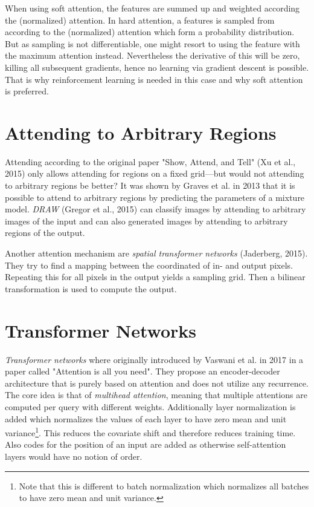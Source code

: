 		When using soft attention, the features are summed up and weighted according the (normalized) attention. In hard attention, a features is sampled from according to the (normalized) attention which form a probability distribution. But as sampling is not differentiable, one might resort to using the feature with the maximum attention instead. Nevertheless the derivative of this will be zero, killing all subsequent gradients, hence no learning via gradient descent is possible. That is why reinforcement learning is needed in this case and why soft attention is preferred.

	\section{Attending to Arbitrary Regions}
		Attending according to the original paper "Show, Attend, and Tell" (Xu et al., 2015) only allows attending for regions on a fixed grid---but would not attending to arbitrary regions be better? It was shown by Graves et al. in 2013 that it is possible to attend to arbitrary regions by predicting the parameters of a mixture model. \emph{DRAW} (Gregor et al., 2015) can classify images by attending to arbitrary images of the input and can also generated images by attending to arbitrary regions of the output.

		Another attention mechanism are \emph{spatial transformer networks} (Jaderberg, 2015). They try to find a mapping between the coordinated of in- and output pixels. Repeating this for all pixels in the output yields a sampling grid. Then a bilinear transformation is used to compute the output.

	\section{Transformer Networks}
		\emph{Transformer networks} where originally introduced by Vaswani et al. in 2017 in a paper called "Attention is all you need". They propose an encoder-decoder architecture that is purely based on attention and does not utilize any recurrence. The core idea is that of \emph{multihead attention}, meaning that multiple attentions are computed per query with different weights. Additionally layer normalization is added which normalizes the values of each layer to have zero mean and unit variance\footnote{Note that this is different to batch normalization which normalizes all batches to have zero mean and unit variance.}. This reduces the covariate shift and therefore reduces training time. Also codes for the position of an input are added as otherwise self-attention layers would have no notion of order.

